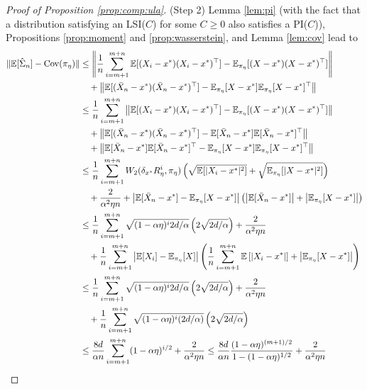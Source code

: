 \documentclass[12pt,reqno]{amsart}
\theoremstyle{remark}
\theoremstyle{definition}
\newcommand{\E}{\mathbb{E}}
\newcommand{\Cov}{\textnormal{Cov}}
\begin{document}
\begin{proof}[Proof of Proposition \ref{prop:comp:ula}]
    (Step 2)
    Lemma \ref{lem:pi} (with the fact that a distribution satisfying an LSI($C$) for some $C\ge0$ also satisfies a PI($C$)), Propositions \ref{prop:moment} and \ref{prop:wasserstein}, and Lemma \ref{lem:cov} lead to
    \begin{align*}
    \|\E[\hat{\Sigma}_{n}]-\Cov(\pi_{\eta})\|
    &\le \left\|\frac{1}{n}\sum_{i=m+1}^{m+n}\E[(X_{i}-x^{\ast})(X_{i}-x^{\ast})^{\top}]-\E_{\pi_{\eta}}[(X-x^{\ast})(X-x^{\ast})^{\top}]\right\|\\
    &\quad+\left\|\E[(\bar{X}_{n}-x^{\ast})(\bar{X}_{n}-x^{\ast})^{\top}]-\E_{\pi_{\eta}}[X-x^{\ast}]\E_{\pi_{\eta}}[X-x^{\ast}]^{\top}\right\|\\ 
    &\le \frac{1}{n}\sum_{i=m+1}^{m+n}\left\|\E[(X_{i}-x^{\ast})(X_{i}-x^{\ast})^{\top}]-\E_{\pi_{\eta}}[(X-x^{\ast})(X-x^{\ast})^{\top}]\right\|\\
    &\quad+\left\|\E[(\bar{X}_{n}-x^{\ast})(\bar{X}_{n}-x^{\ast})^{\top}]-\E[\bar{X}_{n}-x^{\ast}]\E[\bar{X}_{n}-x^{\ast}]^{\top}\right\|\\
    &\quad+\left\|\E[\bar{X}_{n}-x^{\ast}]\E[\bar{X}_{n}-x^{\ast}]^{\top}-\E_{\pi_{\eta}}[X-x^{\ast}]\E_{\pi_{\eta}}[X-x^{\ast}]^{\top}\right\|\\ 
    &\le \frac{1}{n}\sum_{i=m+1}^{m+n}W_{2}(\delta_{x^{\ast}}R_{\eta}^{i},\pi_{\eta})\left(\sqrt{\E[|X_{i}-x^{\ast}|^{2}]}+\sqrt{\E_{\pi_{\eta}}[|X-x^{\ast}|^{2}]}\right)\\
    &\quad+\frac{2}{\alpha^{2}\eta n}+\left|\E[\bar{X}_{n}-x^{\ast}]-\E_{\pi_{\eta}}[X-x^{\ast}]\right|\left(\left|\E[\bar{X}_{n}-x^{\ast}]\right|+\left|\E_{\pi_{\eta}}[X-x^{\ast}]\right|\right)\\
    &\le \frac{1}{n}\sum_{i=m+1}^{m+n}\sqrt{(1-\alpha\eta)^{i}2d/\alpha}\left(2\sqrt{2d/\alpha}\right)+\frac{2}{\alpha^{2}\eta n}\\
    &\quad+\frac{1}{n}\sum_{i=m+1}^{m+n}\left|\E[X_{i}]-\E_{\pi_{\eta}}[X]\right|\left(\frac{1}{n}\sum_{i=m+1}^{m+n}\E\left[\left|X_{i}-x^{\ast}\right|\right]+\left|\E_{\pi_{\eta}}[X-x^{\ast}]\right|\right)
    \\
    &\le \frac{1}{n}\sum_{i=m+1}^{m+n}\sqrt{(1-\alpha\eta)^{i}2d/\alpha}\left(2\sqrt{2d/\alpha}\right)+\frac{2}{\alpha^{2}\eta n}\\
    &\quad+\frac{1}{n}\sum_{i=m+1}^{m+n}\sqrt{(1-\alpha\eta)^{i}(2d/\alpha)}\left(2\sqrt{2d/\alpha}\right)\\
    &\le \frac{8d}{\alpha n}\sum_{i=m+1}^{m+n}(1-\alpha\eta)^{i/2}+\frac{2}{\alpha^{2}\eta n}
    \le \frac{8d}{\alpha n}\frac{(1-\alpha\eta)^{(m+1)/2}}{1-(1-\alpha\eta)^{1/2}}+\frac{2}{\alpha^{2}\eta n}\\

\end{align*}
\end{proof}
\end{document}
